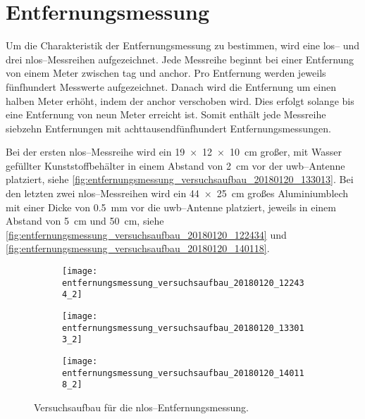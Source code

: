 \section{Entfernungsmessung}

Um die Charakteristik der Entfernungsmessung zu bestimmen, wird eine \Gls{los}-- und drei \Gls{nlos}--Messreihen aufgezeichnet. Jede Messreihe beginnt bei einer Entfernung von einem Meter zwischen \Gls{tag} und \Gls{anchor}. Pro Entfernung werden jeweils fünfhundert Messwerte aufgezeichnet. Danach wird die Entfernung um einen halben Meter erhöht, indem der \Gls{anchor} verschoben wird. Dies erfolgt solange bis eine Entfernung von neun Meter erreicht ist. Somit enthält jede Messreihe siebzehn Entfernungen mit achttausendfünfhundert Entfernungsmessungen.

Bei der ersten \Gls{nlos}--Messreihe wird ein \SI{19x12x10}{\centi\meter} großer, mit Wasser gefüllter Kunststoffbehälter in einem Abstand von \SI{2}{\centi\meter} vor der \Gls{uwb}--Antenne platziert, siehe \autoref{fig:entfernungsmessung_versuchsaufbau_20180120_133013}. Bei den letzten zwei \Gls{nlos}--Messreihen wird ein \SI{44x25}{\centi\meter} großes Aluminiumblech mit einer Dicke von \SI{0.5}{\milli\meter} vor die \Gls{uwb}--Antenne platziert, jeweils in einem Abstand von \SI{5}{\centi\meter} und \SI{50}{\centi\meter}, siehe \autoref{fig:entfernungsmessung_versuchsaufbau_20180120_122434} und \autoref{fig:entfernungsmessung_versuchsaufbau_20180120_140118}.

\begin{figure}[ht]
	\begin{minipage}{0.49\linewidth}
		\begin{subfigure}{\linewidth}
			\texttt{[image: entfernungsmessung\_versuchsaufbau\_20180120\_122434\_2]}
			\caption{ }
			\label{fig:entfernungsmessung_versuchsaufbau_20180120_122434}
		\end{subfigure}
	\end{minipage}
	\hfill
	\begin{minipage}{0.49\linewidth}
			\begin{minipage}{\linewidth}
				\begin{subfigure}{\linewidth}
					\texttt{[image: entfernungsmessung\_versuchsaufbau\_20180120\_133013\_2]}
					\caption{ }
					\label{fig:entfernungsmessung_versuchsaufbau_20180120_133013}
				\end{subfigure}
			\end{minipage}
			\par
			\bigskip
			\begin{minipage}{\linewidth}
				\begin{subfigure}{\linewidth}
					\texttt{[image: entfernungsmessung\_versuchsaufbau\_20180120\_140118\_2]}
					\caption{ }
					\label{fig:entfernungsmessung_versuchsaufbau_20180120_140118}
				\end{subfigure}	
			\end{minipage}
	\end{minipage}
	\caption{Versuchsaufbau für die \Gls{nlos}--Entfernungsmessung.}
	\label{fig:entfernungsmessung_versuchsaufbau_20180120}
\end{figure}



